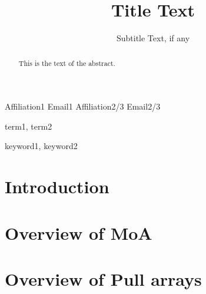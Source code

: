 \documentclass{sigplanconf}
\begin{document}
\setlength{\pdfpageheight}{\paperheight}
\setlength{\pdfpagewidth}{\paperwidth}






\title{Title Text}
\subtitle{Subtitle Text, if any}

           {Affiliation1}
           {Email1}
           {Affiliation2/3}
           {Email2/3}

\maketitle

\begin{abstract}
This is the text of the abstract.
\end{abstract}


\terms
term1, term2

\keywords
keyword1, keyword2

\section{Introduction}

\section{Overview of MoA}

\section{Overview of Pull arrays}
\end{document}
